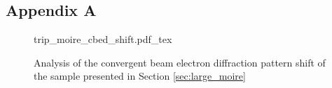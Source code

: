 \subsection*{Appendix A}
\label{appendix:a}

\begin{figure}[h]
    \centering
    \def\svgwidth{.7\linewidth}
    {trip_moire_cbed_shift.pdf_tex}
    \caption{Analysis of the convergent beam electron diffraction pattern shift of the sample presented in Section \ref{sec:large_moire}}
    \label{fig:appendix_cbed_trip_moire}
\end{figure}

\subsection*{}

